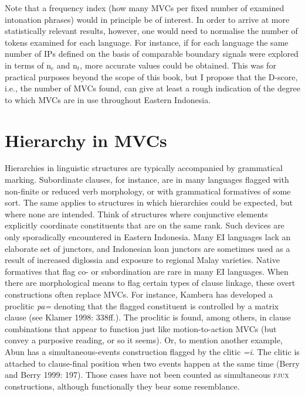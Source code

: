 Note that a frequency index (how many MVCs per fixed number of examined intonation phrases) would in principle be of interest. In order to arrive at more statistically relevant results, however, one would need to normalise the number of tokens examined for each language. For instance, if for each language the same number of IPs defined on the basis of comparable boundary signals were explored in terms of n$_c$ and n$_t$, more accurate values could be obtained. This was for practical purposes beyond the scope of this book, but I propose that the D-score, i.e., the number of MVCs found, can give at least a rough indication of the degree to which MVCs are in use throughout Eastern Indonesia.

\section{Hierarchy in MVCs} \label{sec:hierarchy}

Hierarchies in linguistic structures are typically accompanied by grammatical marking. Subordinate clauses, for instance, are in many languages flagged with non-finite or reduced verb morphology, or with grammatical formatives of some sort. The same applies to structures in which hierarchies could be expected, but where none are intended. Think of structures where conjunctive elements explicitly coordinate constituents that are on the same rank. Such devices are only sporadically encountered in Eastern Indonesia. Many EI languages lack an elaborate set of junctors, and Indonesian loan junctors are sometimes used as a result of increased diglossia and exposure to regional Malay varieties. Native formatives that flag co- or subordination are rare in many EI languages. When there are morphological means to flag certain types of clause linkage, these overt constructions often replace MVCs. For instance, Kambera has developed a proclitic \textit{pa=} denoting that the flagged constituent is controlled by a matrix clause (see Klamer 1998: 338ff.). The proclitic is found, among others, in clause combinations that appear to function just like motion-to-action MVCs (but convey a purposive reading, or so it seems). Or, to mention another example, Abun has a simultaneous-events construction flagged by the clitic \textit{=i}. The clitic is attached to clause-final position when two events happen at the same time (Berry and Berry 1999: 197). Those cases have not been counted as simultaneous \textsc{fjux} constructions, although functionally they bear some resemblance.

